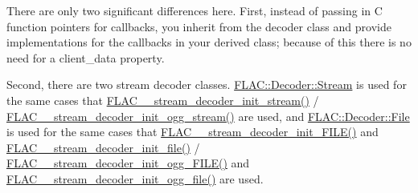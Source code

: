 There are only two significant differences here. First, instead of passing in C function pointers for callbacks, you inherit from the decoder class and provide implementations for the callbacks in your derived class; because of this there is no need for a \textquotesingle{}client\+\_\+data\textquotesingle{} property.

Second, there are two stream decoder classes. \hyperlink{class_f_l_a_c_1_1_decoder_1_1_stream}{F\+L\+A\+C\+::\+Decoder\+::\+Stream} is used for the same cases that \hyperlink{group__flac__stream__decoder_ga32c28a56a2bdfa2333edbd3d991894d7}{F\+L\+A\+C\+\_\+\+\_\+stream\+\_\+decoder\+\_\+init\+\_\+stream()} / \hyperlink{group__flac__stream__decoder_ga78bf285b54e5aaee73a214c108683a72}{F\+L\+A\+C\+\_\+\+\_\+stream\+\_\+decoder\+\_\+init\+\_\+ogg\+\_\+stream()} are used, and \hyperlink{class_f_l_a_c_1_1_decoder_1_1_file}{F\+L\+A\+C\+::\+Decoder\+::\+File} is used for the same cases that \hyperlink{group__flac__stream__decoder_ga38f9eb46bf112af205f86b4cbac9980c}{F\+L\+A\+C\+\_\+\+\_\+stream\+\_\+decoder\+\_\+init\+\_\+\+F\+I\+L\+E()} and \hyperlink{group__flac__stream__decoder_ga1692108a97012d1c5f79baf7df012c33}{F\+L\+A\+C\+\_\+\+\_\+stream\+\_\+decoder\+\_\+init\+\_\+file()} / \hyperlink{group__flac__stream__decoder_gac6a35b1db07e057ec9912f637b37dd74}{F\+L\+A\+C\+\_\+\+\_\+stream\+\_\+decoder\+\_\+init\+\_\+ogg\+\_\+\+F\+I\+L\+E()} and \hyperlink{group__flac__stream__decoder_ga609f2a43987d6abeaef654575462030c}{F\+L\+A\+C\+\_\+\+\_\+stream\+\_\+decoder\+\_\+init\+\_\+ogg\+\_\+file()} are used. 